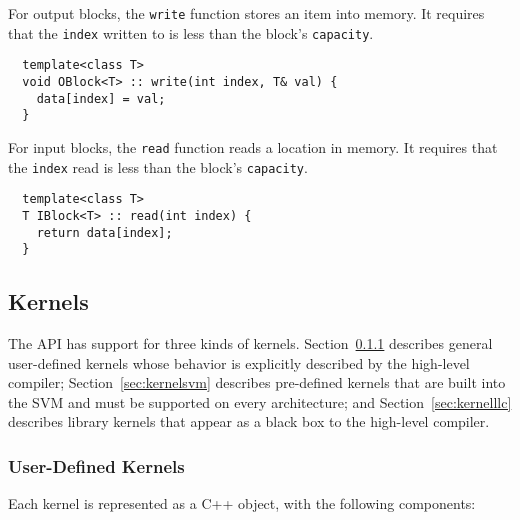  For output blocks, the {\tt write} function stores an
item into memory.  It requires that the {\tt index} written to is less
than the block's {\tt capacity}.  
{\small
\begin{verbatim}
  template<class T>
  void OBlock<T> :: write(int index, T& val) {
    data[index] = val;
  }
\end{verbatim}}

 For input blocks, the {\tt read} function reads a location
in memory.  It requires that the {\tt index} read is less than the
block's {\tt capacity}.
{\small
\begin{verbatim}
  template<class T>
  T IBlock<T> :: read(int index) {
    return data[index];
  }
\end{verbatim}}

\subsection{Kernels}
\label{sec:kernel}

The API has support for three kinds of kernels.
Section~\ref{sec:kernelhlc} describes general user-defined kernels
whose behavior is explicitly described by the high-level compiler;
Section~\ref{sec:kernelsvm} describes pre-defined kernels that are
built into the SVM and must be supported on every architecture; and
Section~\ref{sec:kernelllc} describes library kernels that appear as a
black box to the high-level compiler.

\subsubsection{User-Defined Kernels}
\label{sec:kernelhlc}


Each kernel is represented as a C++ object, with the following
components:

